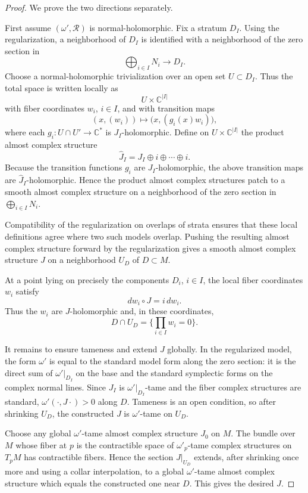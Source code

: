 \documentclass[11pt]{article}
\newcommand{\RR}{\mathcal R}
\newcommand{\C}{\mathbb C}
\begin{document}
\begin{proof}
We prove the two directions separately.

First assume \((\omega',\RR)\) is normal-holomorphic.  Fix a stratum \(D_I\).
Using the regularization, a neighborhood of \(D_I\) is identified with a
neighborhood of the zero section in
\[
        \bigoplus_{i\in I} N_i \longrightarrow D_I .
\]
Choose a normal-holomorphic trivialization over an open set
\(U\subset D_I\).  Thus the total space is written locally as
\[
        U\times \C^{|I|}
\]
with fiber coordinates \(w_i\), \(i\in I\), and with transition maps
\[
        (x,(w_i))\longmapsto
        \bigl(x,(g_i(x)w_i)\bigr),
\]
where each \(g_i:U\cap U'\to \C^*\) is \(J_I\)-holomorphic.  Define on
\(U\times\C^{|I|}\) the product almost complex structure
\[
        \widehat J_I = J_I\oplus i\oplus\cdots\oplus i .
\]
Because the transition functions \(g_i\) are \(J_I\)-holomorphic, the above
transition maps are \(\widehat J_I\)-holomorphic.  Hence the product almost
complex structures patch to a smooth almost complex structure on a
neighborhood of the zero section in \(\bigoplus_{i\in I}N_i\).

Compatibility of the regularization on overlaps of strata ensures that these
local definitions agree where two such models overlap.  Pushing the resulting
almost complex structure forward by the regularization gives a smooth almost
complex structure \(J\) on a neighborhood \(U_D\) of \(D\subset M\).

At a point lying on precisely the components \(D_i\), \(i\in I\), the local
fiber coordinates \(w_i\) satisfy
\[
        dw_i\circ J=i\,dw_i .
\]
Thus the \(w_i\) are \(J\)-holomorphic and, in these coordinates,
\[
        D\cap U_D = \bigl\{ \prod_{i\in I} w_i=0\bigr\}.
\]

It remains to ensure tameness and extend \(J\) globally.  In the regularized
model, the form \(\omega'\) is equal to the standard model form along the zero
section: it is the direct sum of \(\omega'|_{D_I}\) on the base and the
standard symplectic forms on the complex normal lines.  Since \(J_I\) is
\(\omega'|_{D_I}\)-tame and the fiber complex structures are standard,
\(\omega'(\cdot,J\cdot)>0\) along \(D\).  Tameness is an open condition, so
after shrinking \(U_D\), the constructed \(J\) is \(\omega'\)-tame on \(U_D\).

Choose any global \(\omega'\)-tame almost complex structure \(J_0\) on \(M\).
The bundle over \(M\) whose fiber at \(p\) is the contractible space of
\(\omega'_p\)-tame complex structures on \(T_pM\) has contractible fibers.
Hence the section \(J|_{U_D}\) extends, after shrinking once more and using a
collar interpolation, to a global \(\omega'\)-tame almost complex structure
which equals the constructed one near \(D\).  This gives the desired \(J\).


\end{proof}
\end{document}
